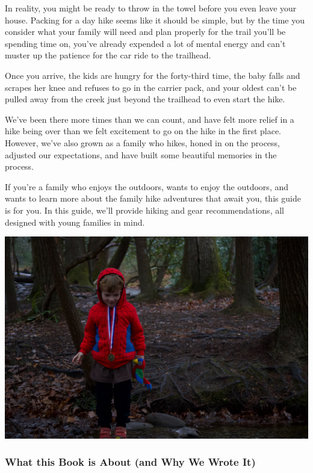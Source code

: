 \documentclass[
  letterpaper,
  DIV=11,
  numbers=noendperiod]{scrartcl}
\begin{document}
In reality, you might be ready to throw in the towel before you even
leave your house. Packing for a day hike seems like it should be simple,
but by the time you consider what your family will need and plan
properly for the trail you'll be spending time on, you've already
expended a lot of mental energy and can't muster up the patience for the
car ride to the trailhead.

Once you arrive, the kids are hungry for the forty-third time, the baby
falls and scrapes her knee and refuses to go in the carrier pack, and
your oldest can't be pulled away from the creek just beyond the
trailhead to even start the hike.

We've been there more times than we can count, and have felt more relief
in a hike being over than we felt excitement to go on the hike in the
first place. However, we've also grown as a family who hikes, honed in
on the process, adjusted our expectations, and have built some beautiful
memories in the process.

If you're a family who enjoys the outdoors, wants to enjoy the outdoors,
and wants to learn more about the family hike adventures that await you,
this guide is for you. In this guide, we'll provide hiking and gear
recommendations, all designed with young families in mind.

\includegraphics{img/jonahinthewater.jpg}

\hypertarget{what-this-book-is-about-and-why-we-wrote-it}{%
\subsubsection{What this Book is About (and Why We Wrote
It)}\label{what-this-book-is-about-and-why-we-wrote-it}}
\end{document}
